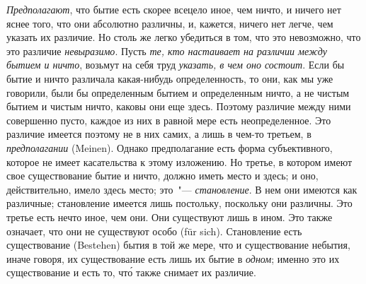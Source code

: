 \emph{Предполагают}, что бытие есть скорее всецело иное,
чем ничто, и ничего нет яснее того, что они абсолютно
различны, и, кажется, ничего нет легче, чем указать их
различие. Но столь же легко убедиться в том, что это невозможно,
что это различие \emph{невыразимо}. Пусть \emph{те, кто
настаивает на различии между бытием и ничто}, возьмут
на себя труд \emph{указать, в чем оно состоит}. Если бы бытие
и ничто различала какая-нибудь определенность, то они,
как мы уже говорили, были бы определенным бытием и
определенным ничто, а не чистым бытием и чистым ничто,
каковы они еще здесь. Поэтому различие между ними
совершенно пусто, каждое из них в равной мере есть
неопределенное. Это различие имеется поэтому не в них
самих, а лишь в чем-то третьем, в \emph{предполагании} (Meinen).
Однако предполагание есть форма субъективного,
которое не имеет касательства к этому изложению. Но
третье, в котором имеют свое существование бытие и ничто,
должно иметь место и здесь; и оно, действительно,
имело здесь место; это~"--- \emph{становление}. В нем они имеются
как различные; становление имеется лишь постольку, поскольку
они различны. Это третье есть нечто иное, чем
они. Они существуют лишь в ином. Это также означает,
что они не существуют особо (für sich). Становление есть
существование (Bestehen) бытия в той же мере, что и существование
небытия, иначе говоря, их существование
есть лишь их бытие в \emph{одном}; именно это их существование
и есть то, чт\'о также снимает их различие.

